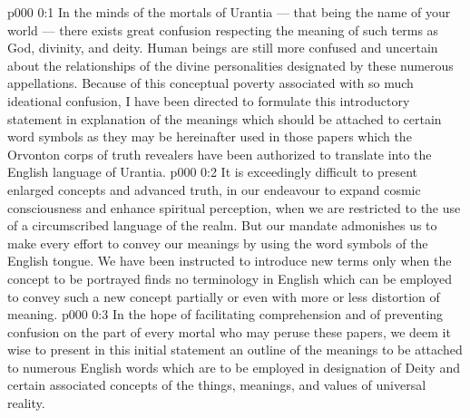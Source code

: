 \author{Divine Counsellor}
\vs p000 0:1 In the minds of the mortals of Urantia --- that being the name of your world --- there exists great confusion respecting the meaning of such terms as God, divinity, and deity. Human beings are still more confused and uncertain about the relationships of the divine personalities designated by these numerous appellations. Because of this conceptual poverty associated with so much ideational confusion, I have been directed to formulate this introductory statement in explanation of the meanings which should be attached to certain word symbols as they may be hereinafter used in those papers which the Orvonton corps of truth revealers have been authorized to translate into the English language of Urantia.
\vs p000 0:2 It is exceedingly difficult to present enlarged concepts and advanced truth, in our endeavour to expand cosmic consciousness and enhance spiritual perception, when we are restricted to the use of a circumscribed language of the realm. But our mandate admonishes us to make every effort to convey our meanings by using the word symbols of the English tongue. We have been instructed to introduce new terms only when the concept to be portrayed finds no terminology in English which can be employed to convey such a new concept partially or even with more or less distortion of meaning.
\vs p000 0:3 In the hope of facilitating comprehension and of preventing confusion on the part of every mortal who may peruse these papers, we deem it wise to present in this initial statement an outline of the meanings to be attached to numerous English words which are to be employed in designation of Deity and certain associated concepts of the things, meanings, and values of universal reality.

